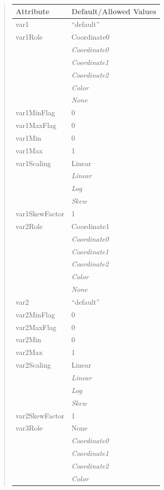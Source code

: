 \documentclass[letterpaper,10pt,english]{sphinxmanual}
\begin{document}
\begin{quote}
\begin{longtable}{|l|l|}
\textbf{Attribute}
 & 
\textbf{Default/Allowed Values}
\\
\hline
var1
 & 
``default''
\\
\hline
var1Role
 & 
Coordinate0
\\
\hline & 
\emph{Coordinate0}
\\
\hline & 
\emph{Coordinate1}
\\
\hline & 
\emph{Coordinate2}
\\
\hline & 
\emph{Color}
\\
\hline & 
\emph{None}
\\
\hline
var1MinFlag
 & 
0
\\
\hline
var1MaxFlag
 & 
0
\\
\hline
var1Min
 & 
0
\\
\hline
var1Max
 & 
1
\\
\hline
var1Scaling
 & 
Linear
\\
\hline & 
\emph{Linear}
\\
\hline & 
\emph{Log}
\\
\hline & 
\emph{Skew}
\\
\hline
var1SkewFactor
 & 
1
\\
\hline
var2Role
 & 
Coordinate1
\\
\hline & 
\emph{Coordinate0}
\\
\hline & 
\emph{Coordinate1}
\\
\hline & 
\emph{Coordinate2}
\\
\hline & 
\emph{Color}
\\
\hline & 
\emph{None}
\\
\hline
var2
 & 
``default''
\\
\hline
var2MinFlag
 & 
0
\\
\hline
var2MaxFlag
 & 
0
\\
\hline
var2Min
 & 
0
\\
\hline
var2Max
 & 
1
\\
\hline
var2Scaling
 & 
Linear
\\
\hline & 
\emph{Linear}
\\
\hline & 
\emph{Log}
\\
\hline & 
\emph{Skew}
\\
\hline
var2SkewFactor
 & 
1
\\
\hline
var3Role
 & 
None
\\
\hline & 
\emph{Coordinate0}
\\
\hline & 
\emph{Coordinate1}
\\
\hline & 
\emph{Coordinate2}
\\
\hline & 
\emph{Color}
\\

\end{longtable}
\end{quote}
\end{document}

